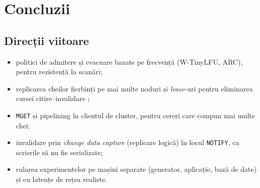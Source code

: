 \chapter{Concluzii}
\label{ch:concluzii}



\section{Direcții viitoare}

\begin{itemize}
  \item politici de admitere și evacuare bazate pe frecvență (W-TinyLFU, ARC), pentru rezistență la scanări;
  \item replicarea cheilor fierbinți pe mai multe noduri și \emph{lease}-uri pentru eliminarea cursei
        citire–invalidare \cite{memcache-fb};
  \item \texttt{MGET} și pipelining în clientul de cluster, pentru cereri care compun mai multe chei;
  \item invalidare prin \emph{change data capture} (replicare logică) în locul \texttt{NOTIFY}, ca
        scrierile să nu fie serializate;
  \item rularea experimentelor pe mașini separate (generator, aplicație, bază de date) și cu latențe de
        rețea realiste.
\end{itemize}
